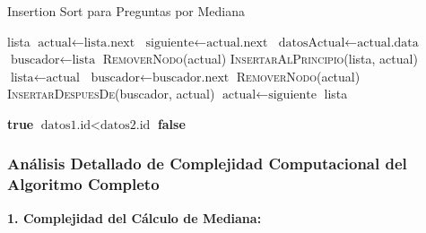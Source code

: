 \documentclass[11pt,a4paper]{article}
\begin{document}
\begin{algorithm}[H]
\caption{Insertion Sort para Preguntas por Mediana}
\begin{algorithmic}[1]
        \State \Return lista 
    \EndIf
    \State $\text{actual} \leftarrow \text{lista.next}$
        \State $\text{siguiente} \leftarrow \text{actual.next}$
        \State $\text{datosActual} \leftarrow \text{actual.data}$
        \State $\text{buscador} \leftarrow \text{lista}$
            \State \textsc{RemoverNodo}(actual) 
            \State \textsc{InsertarAlPrincipio}(lista, actual) 
            \State $\text{lista} \leftarrow \text{actual}$
        \Else
                \State $\text{buscador} \leftarrow \text{buscador.next}$
            \EndWhile
             
                \State \textsc{RemoverNodo}(actual)
                \State \textsc{InsertarDespuesDe}(buscador, actual)
            \EndIf
        \EndIf
        \State $\text{actual} \leftarrow \text{siguiente}$
    \EndWhile
    \State \Return lista
\EndProcedure

        \State \Return \textbf{true}
        \State \Return $\text{datos1.id} < \text{datos2.id}$ 
    \Else
        \State \Return \textbf{false}
    \EndIf
\EndProcedure
\end{algorithmic}
\end{algorithm}

\subsubsection{Análisis Detallado de Complejidad Computacional del Algoritmo Completo}

\textbf{1. Complejidad del Cálculo de Mediana:}
\end{document}
